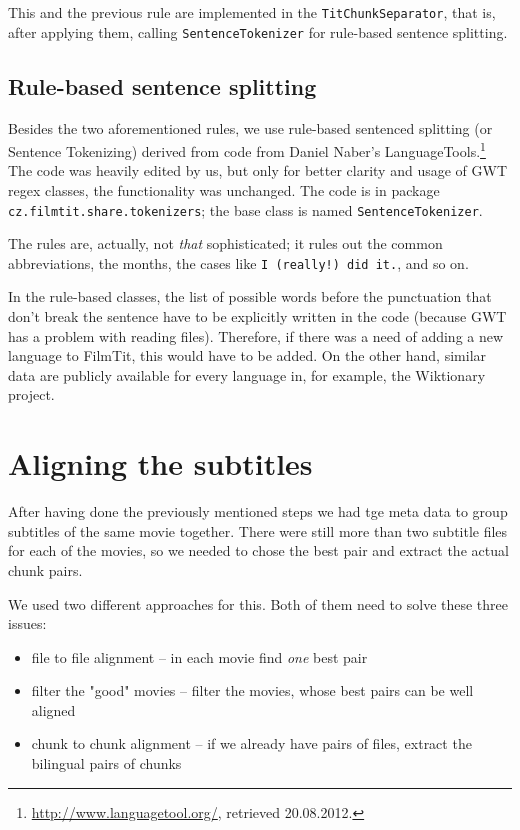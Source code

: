 This and the previous rule are implemented in the \texttt{TitChunkSeparator}, that is, after applying them, calling \texttt{SentenceTokenizer} for rule-based sentence splitting.

\subsection*{Rule-based sentence splitting}
Besides the two aforementioned rules, we use rule-based sentenced splitting (or Sentence Tokenizing) derived from code from Daniel Naber's LanguageTools.\footnote{\url{http://www.languagetool.org/}, retrieved 20.08.2012.} The code was heavily edited by us, but only for better clarity and usage of GWT regex classes, the functionality was unchanged. The code is in package \texttt{cz.filmtit.share.tokenizers}; the base class is named \texttt{SentenceTokenizer}.

The rules are, actually, not \emph{that} sophisticated; it rules out the common abbreviations, the months, the cases like \texttt{I (really!) did it.}, and so on.

In the rule-based classes, the list of possible words before the punctuation that don't break the sentence have to be explicitly written in the code (because GWT has a problem with reading files). Therefore, if there was a need of adding a new language to FilmTit, this would have to be added. On the other hand, similar data are publicly available for every language in, for example, the Wiktionary project.

\section{Aligning the subtitles}
\label{sec:aligning_subtitles}

After having done the previously mentioned steps we had tge meta data to group subtitles of the same movie together. There were still more than two subtitle files for each of the movies, so we needed to chose the best pair and extract the actual chunk pairs.

We used two different approaches for this. Both of them need to solve these three issues:
\begin{itemize}
    \item file to file alignment -- in each movie find \emph{one} best pair
    \item filter the "good" movies -- filter the movies, whose best pairs can be well aligned
    \item chunk to chunk alignment -- if we already have pairs of files, extract the bilingual pairs of chunks 
\end{itemize}

